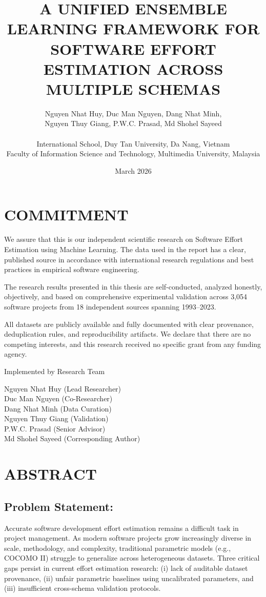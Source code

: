 \documentclass[11pt,a4paper]{article}
\title{\textbf{A UNIFIED ENSEMBLE LEARNING FRAMEWORK FOR\\SOFTWARE EFFORT ESTIMATION ACROSS MULTIPLE SCHEMAS}}
\author{
Nguyen Nhat Huy, Duc Man Nguyen, Dang Nhat Minh,\\
Nguyen Thuy Giang, P.W.C. Prasad, Md Shohel Sayeed\\
\\
\small International School, Duy Tan University, Da Nang, Vietnam\\
\small Faculty of Information Science and Technology, Multimedia University, Malaysia
}
\date{March 2026}
\begin{document}
\thispagestyle{plain}
\maketitle

\newpage
\section*{COMMITMENT}

We assure that this is our independent scientific research on Software Effort Estimation using Machine Learning. The data used in the report has a clear, published source in accordance with international research regulations and best practices in empirical software engineering.

The research results presented in this thesis are self-conducted, analyzed honestly, objectively, and based on comprehensive experimental validation across 3,054 software projects from 18 independent sources spanning 1993--2023.

All datasets are publicly available and fully documented with clear provenance, deduplication rules, and reproducibility artifacts. We declare that there are no competing interests, and this research received no specific grant from any funding agency.

\vspace{2cm}

\noindent Implemented by Research Team\\
\vspace{1cm}

\noindent Nguyen Nhat Huy (Lead Researcher)\\
Duc Man Nguyen (Co-Researcher)\\
Dang Nhat Minh (Data Curation)\\
Nguyen Thuy Giang (Validation)\\
P.W.C. Prasad (Senior Advisor)\\
Md Shohel Sayeed (Corresponding Author)

\newpage

\section*{ABSTRACT}

\subsection*{Problem Statement:}
Accurate software development effort estimation remains a difficult task in project management. As modern software projects grow increasingly diverse in scale, methodology, and complexity, traditional parametric models (e.g., COCOMO II) struggle to generalize across heterogeneous datasets. Three critical gaps persist in current effort estimation research: (i) lack of auditable dataset provenance, (ii) unfair parametric baselines using uncalibrated parameters, and (iii) insufficient cross-schema validation protocols.
\end{document}
